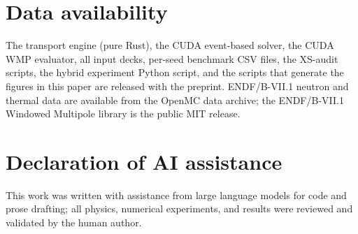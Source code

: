 \section*{Data availability}

The transport engine (pure Rust), the CUDA event-based solver,
the CUDA WMP evaluator, all input decks, per-seed benchmark
CSV files, the XS-audit scripts, the hybrid experiment Python
script, and the scripts that generate the figures in this
paper are released with the preprint. ENDF/B-VII.1 neutron
and thermal data are available from the OpenMC data archive;
the ENDF/B-VII.1 Windowed Multipole library is the public
MIT release.

\section*{Declaration of AI assistance}

This work was written with assistance from large language
models for code and prose drafting; all physics, numerical
experiments, and results were reviewed and validated by the
human author.

